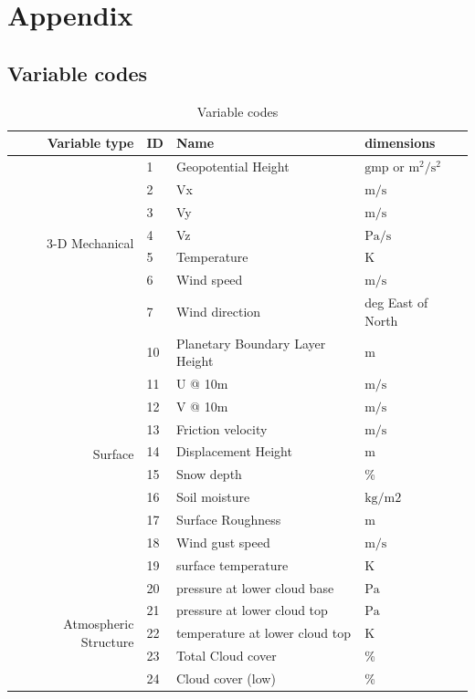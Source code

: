 \documentclass[11pt]{article}   %
\begin{document}
\clearpage

\section{Appendix}
\subsection{Variable codes}\label{ApVar}
\begin{table}[h]\label{TabVar}
\caption{Variable codes}
\small
\begin{tabular}{| r | l | l | l |}
\hline
Variable type & ID & Name & dimensions \\
\hline
\multirow{7}{*}{3-D Mechanical} 
 &  1 & Geopotential Height & $\mathrm{gmp}$ or $\mathrm{m^2/s^2}$ \\
 &  2 & Vx & $\mathrm{m/s}$ \\
 &  3 & Vy & $\mathrm{m/s}$ \\
 &  4 & Vz & $\mathrm{Pa/s}$ \\
 &  5 & Temperature  & $\mathrm{K}$ \\
 &  6 & Wind speed & $\mathrm{m/s}$ \\
 &  7 & Wind direction &deg East of North \\
\hline
\multirow{10}{*}{Surface}
 &  10 & Planetary Boundary Layer Height & $\mathrm{m}$ \\
 &  11 & U @ 10m & $\mathrm{m/s}$ \\
 &  12 & V @ 10m & $\mathrm{m/s}$ \\
 &  13 & Friction velocity & $\mathrm{m/s}$ \\
 &  14 & Displacement Height & $\mathrm{m}$ \\
 &  15 & Snow depth & \% \\
 &  16 & Soil moisture & $\mathrm{kg/m2}$ \\
 &  17 & Surface Roughness & $\mathrm{m}$ \\
 &  18 & Wind gust speed & $\mathrm{m/s}$ \\
 &  19 & surface temperature & $\mathrm{K}$ \\
\hline
\multirow{6}{*}{Atmospheric Structure}
 &  20 & pressure at lower cloud base & $\mathrm{Pa}$ \\
 &  21 & pressure at lower cloud top & $\mathrm{Pa}$ \\
 &  22 & temperature at lower cloud top & $\mathrm{K}$ \\
 &  23 & Total Cloud cover & \% \\
 &  24 & Cloud cover (low) & \% \\

\end{tabular}
\end{table}
\end{document}
